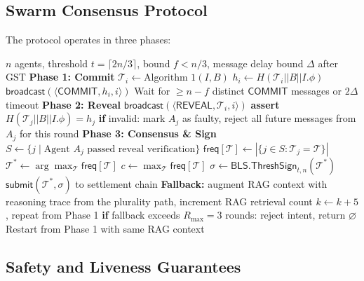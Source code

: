 \documentclass[11pt]{article}
\begin{document}
\subsection{Swarm Consensus Protocol}

The protocol operates in three phases:

\begin{algorithm}[t]
\caption{Swarm Consensus Protocol (Partial Synchrony)}
\label{alg:consensus}
\begin{algorithmic}[1]
\Require $n$ agents, threshold $t = \lceil 2n/3 \rceil$, bound $f < n/3$, message delay bound $\Delta$ after GST
\State
\State \textbf{Phase 1: Commit}
    \State $\mathcal{T}_i \gets \text{Algorithm~1}(I, B)$
    \State $h_i \gets H(\mathcal{T}_i || B || I.\phi)$
    \State $\mathsf{broadcast}(\langle \mathsf{COMMIT}, h_i, i \rangle)$
\EndFor
\State Wait for $\ge n-f$ distinct $\mathsf{COMMIT}$ messages or $2\Delta$ timeout
\State
\State \textbf{Phase 2: Reveal}
    \State $\mathsf{broadcast}(\langle \mathsf{REVEAL}, \mathcal{T}_i, i \rangle)$
\EndFor
{}
    \State \textbf{assert} $H(\mathcal{T}_j || B || I.\phi) = h_j$
    \State \textbf{if} invalid: mark $A_j$ as faulty, reject all future messages from $A_j$ for this round
\EndFor
\State
\State \textbf{Phase 3: Consensus \& Sign}
\State $S \gets \{j \mid \text{Agent } A_j \text{ passed reveal verification}\}$
\State $\mathsf{freq}[\mathcal{T}] \gets |\{j \in S : \mathcal{T}_j = \mathcal{T}\}|$ 
\State $\mathcal{T}^* \gets \arg\max_{\mathcal{T}} \mathsf{freq}[\mathcal{T}]$
\State $c \gets \max_{\mathcal{T}} \mathsf{freq}[\mathcal{T}]$
    \State $\sigma \gets \mathsf{BLS.ThreshSign}_{t,n}(\mathcal{T}^*)$ 
    \State $\mathsf{submit}(\mathcal{T}^*, \sigma)$ to settlement chain
    \State \textbf{Fallback:} augment RAG context with reasoning trace from the plurality path, increment RAG retrieval count $k \leftarrow k + 5$, repeat from Phase 1
    \State \textbf{if} fallback exceeds $R_{\max}=3$ rounds: reject intent, return $\varnothing$
\Else
    \State Restart from Phase 1 with same RAG context 
\EndIf
\end{algorithmic}
\end{algorithm}

\subsection{Safety and Liveness Guarantees}
\end{document}
